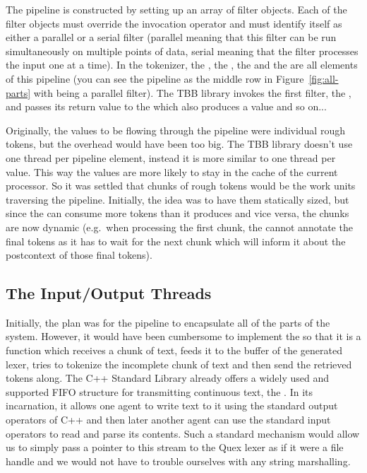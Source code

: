The pipeline is constructed by setting up an array of filter objects. Each of
the filter objects must override the invocation operator and must identify
itself as either a parallel or a serial filter (parallel meaning that this
filter can be run simultaneously on multiple points of data, serial meaning
that the filter processes the input one at a time). In the tokenizer, the
, the , the 
and the  are all elements of this pipeline (you can see
the pipeline as the middle row in Figure~\ref{fig:all-parts} with
 being a parallel filter). The TBB library invokes the
first filter, the , and passes its return value to the
 which also produces a value and so on...

Originally, the values to be flowing through the pipeline were individual rough
tokens, but the overhead would have been too big. The TBB library doesn't use
one thread per pipeline element, instead it is more similar to one thread per
value. This way the values are more likely to stay in the cache of the current
processor. So it was settled that chunks of rough tokens would be the work
units traversing the pipeline. Initially, the idea was to have them statically
sized, but since the  can consume more tokens than it
produces and vice versa, the chunks are now dynamic (e.g.\ when processing the
first chunk, the  cannot annotate the final tokens as it has
to wait for the next chunk which will inform it about the postcontext of those
final tokens).

\subsection{The Input/Output Threads}
\label{ssec:impl-parallel-io}

Initially, the plan was for the pipeline to encapsulate all of the parts of the
system. However, it would have been cumbersome to implement the
 so that it is a function which receives a chunk of text,
feeds it to the buffer of the generated lexer, tries to tokenize the incomplete
chunk of text and then send the retrieved tokens along. The C++ Standard
Library already offers a widely used and supported FIFO structure for
transmitting continuous text, the . In its
 incarnation, it allows one agent to write text to it using
the standard output operators of C++ and then later another agent can use the
standard input operators to read and parse its contents. Such a standard
mechanism would allow us to simply pass a pointer to this stream to the Quex
lexer as if it were a file handle and we would not have to trouble ourselves
with any string marshalling.

